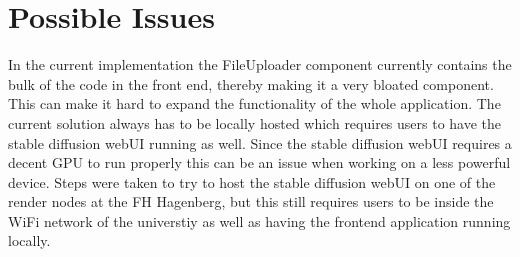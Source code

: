 \documentclass[english,notitlepage,smartquotes]{hgbreport}
\begin{document}
\section{Possible Issues}
In the current implementation the FileUploader component currently contains the bulk of the code in the front end, thereby making it a very bloated component. This can make it hard to expand the functionality of the whole application. 
The current solution always has to be locally hosted which requires users to have the stable diffusion webUI running as well. Since the stable diffusion webUI requires a decent GPU to run properly this can be an issue when working on a less powerful device. Steps were taken to try to host the stable diffusion webUI on one of the render nodes at the FH Hagenberg, but this still requires users to be inside the WiFi network of the universtiy as well as having the frontend application running locally.
\end{document}
